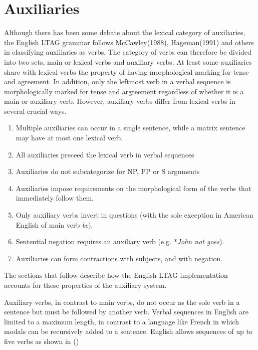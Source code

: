 \section{Auxiliaries}
Although there has been some debate about the lexical category of auxiliaries, the English LTAG grammar follows McCawley(1988), Hageman(1991) and others in classifying auxiliaries as verbs. The category of verbs can therefore be divided into two sets, main or lexical verbs and auxiliary verbs. At least some auxiliaries share with lexical verbs the property  of having morphological marking for tense and agreement.  In addition, only the leftmost verb in a verbal sequence is morphologically marked for tense and argreement  regardless of whether it is a main or auxiliary verb. However, auxiliary verbs differ from lexical verbs in several crucial ways. 

\begin{enumerate}
\item Multiple auxiliaries can occur in a single sentence, while a matrix sentence may have at most one lexical verb. 

\item All auxiliaries preceed the lexical verb in verbal sequences

\item Auxiliaries do not subcategorize for NP, PP or S arguments

\item Auxiliaries impose requirements on the morphological form of the verbs that immediately follow them.

\item Only auxiliary verbs invert in questions (with the sole
exception in American English of main verb {\it be}).

\item Sentential negation requires an auxiliary verb (e.g. *{\it John not goes}).

\item Auxiliaries can form contractions with subjects, and with negation.

\end{enumerate}


The sections that follow describe how the English LTAG implementation accounts for these properties of the auxiliary system.


Auxiliary verbs, in contrast to main verbs, do not  occur as the sole verb in a sentence but must be followed by another verb. Verbal sequences in English are limited to a maximum length, in contrast to a language like French in which modals can be recursively added to a sentence. English allows sequences of up to five verbs as shown in ()


